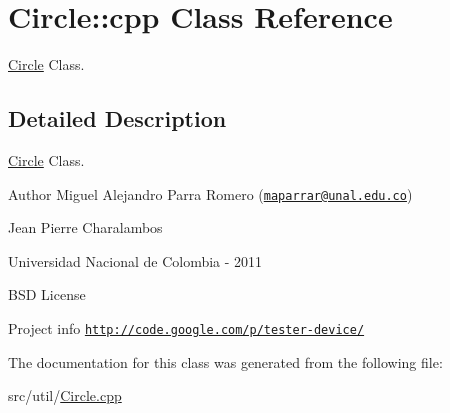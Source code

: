 \hypertarget{class_circle_1_1cpp}{
\section{Circle::cpp Class Reference}
\label{class_circle_1_1cpp}
}


\hyperlink{class_circle}{Circle} Class.  




\subsection{Detailed Description}
\hyperlink{class_circle}{Circle} Class. \begin{DoxyAuthor}{Author}
Miguel Alejandro Parra Romero (\href{mailto:maparrar@unal.edu.co}{\tt maparrar@unal.edu.co}) 

Jean Pierre Charalambos 

Universidad Nacional de Colombia -\/ 2011
\end{DoxyAuthor}
BSD License

Project info \href{http://code.google.com/p/tester-device/}{\tt http://code.google.com/p/tester-\/device/} 

The documentation for this class was generated from the following file:\begin{DoxyCompactItemize}
\item 
src/util/\hyperlink{_circle_8cpp}{Circle.cpp}\end{DoxyCompactItemize}
